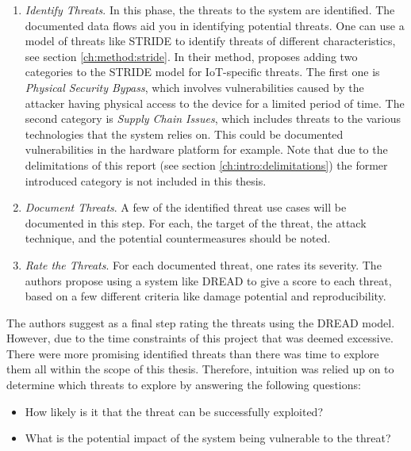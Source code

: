 \begin{enumerate}
    \item \textit{Identify Threats}. In this phase, the threats to the system are identified. The documented data flows aid you in identifying potential threats. One can use a model of threats like STRIDE \cite{stride} to identify threats of different characteristics, see section \ref{ch:method:stride}. In their method, \citeauthor{guzman2017iot} proposes adding two categories to the STRIDE model for IoT-specific threats. The first one is \textit{Physical Security Bypass}, which involves vulnerabilities caused by the attacker having physical access to the device for a limited period of time. The second category is \textit{Supply Chain Issues}, which includes threats to the various technologies that the system relies on. This could be documented vulnerabilities in the hardware platform for example. Note that due to the delimitations of this report (see section \ref{ch:intro:delimitations}) the former introduced category is not included in this thesis.
    
    \item \textit{Document Threats}. A few of the identified threat use cases will be documented in this step. For each, the target of the threat, the attack technique, and the potential countermeasures should be noted.
    
    \item \textit{Rate the Threats}. For each documented threat, one rates its severity. The authors propose using a system like DREAD to give a score to each threat, based on a few different criteria like damage potential and reproducibility.
\end{enumerate}
The authors suggest as a final step rating the threats using the DREAD model. However, due to the time constraints of this project that was deemed excessive. There were more promising identified threats than there was time to explore them all within the scope of this thesis. Therefore, intuition was relied up on to determine which threats to explore by answering the following questions:
\begin{itemize}
    \item How likely is it that the threat can be successfully exploited?
    \item What is the potential impact of the system being vulnerable to the threat?
\end{itemize}

